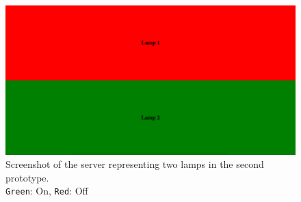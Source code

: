 \begin{figure}[!htb]
    \centering
    \includegraphics[scale=0.2]{images/Prototype2_Server.png}
    \caption[caption]{Screenshot of the server representing two lamps in the second prototype.\\\texttt{Green}: On, \texttt{Red}: Off}
    \label{fig:prototype2-server-screenshot}
\end{figure}
